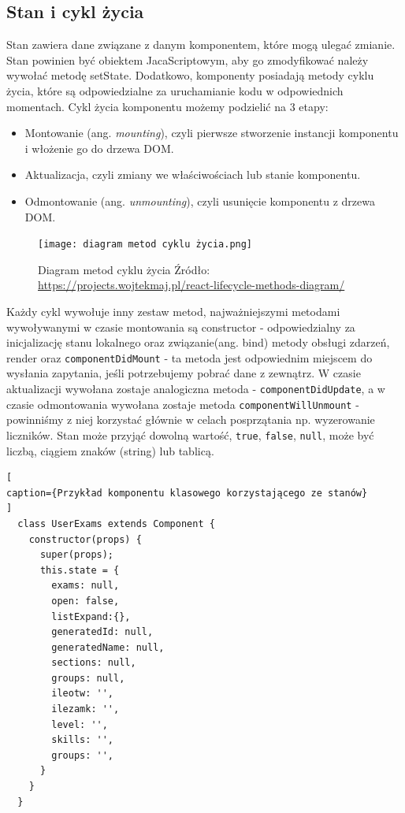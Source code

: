 \documentclass[oneside,polski,logo,indent]{amuthesis}
\begin{document}
\subsection{Stan i cykl życia}{
Stan zawiera dane związane z danym komponentem, które mogą ulegać zmianie. Stan powinien być obiektem JacaScriptowym, aby go zmodyfikować należy wywołać metodę setState. Dodatkowo, komponenty posiadają metody cyklu życia, które są odpowiedzialne za uruchamianie kodu w odpowiednich momentach.
\newline
Cykl życia komponentu możemy podzielić na 3 etapy:
\begin{itemize}
\item Montowanie (ang. \textit{mounting}), czyli pierwsze stworzenie instancji komponentu i włożenie go do drzewa DOM.
\item Aktualizacja, czyli zmiany we właściwościach lub stanie komponentu.
\item Odmontowanie (ang. \textit{unmounting}), czyli usunięcie komponentu z drzewa DOM.
\end{itemize}
\begin{figure}[H]
\centering
\texttt{[image: diagram metod cyklu życia.png]}
\caption{Diagram metod cyklu życia
\newline
Źródło: \url{https://projects.wojtekmaj.pl/react-lifecycle-methods-diagram/}
}
\label{metody cyklu zycia}
\end{figure}
Każdy cykl wywołuje inny zestaw metod, najważniejszymi metodami wywoływanymi w czasie montowania są constructor - odpowiedzialny za inicjalizację stanu lokalnego oraz związanie(ang. bind) metody obsługi zdarzeń, render oraz \texttt{componentDidMount} - ta metoda jest odpowiednim miejscem do wysłania zapytania, jeśli potrzebujemy pobrać dane z zewnątrz.
W czasie aktualizacji wywołana zostaje analogiczna metoda - \texttt{componentDidUpdate}, a w czasie odmontowania wywołana zostaje metoda \texttt{componentWillUnmount} - powinniśmy z niej korzystać głównie w celach posprzątania np. wyzerowanie liczników.
\newline
\newline
Stan może przyjąć dowolną wartość, \texttt{true}, \texttt{false}, \texttt{null}, może być liczbą, ciągiem znaków (string) lub tablicą.
\begin{lstlisting}[
caption={Przykład komponentu klasowego korzystającego ze stanów}
]
  class UserExams extends Component {
    constructor(props) {
      super(props);
      this.state = {
        exams: null,
        open: false,
        listExpand:{},
        generatedId: null,
        generatedName: null,
        sections: null,
        groups: null,
        ileotw: '',
        ilezamk: '',
        level: '',
        skills: '', 
        groups: '',
      }
    }
  }
\end{lstlisting}
}
\end{document}
